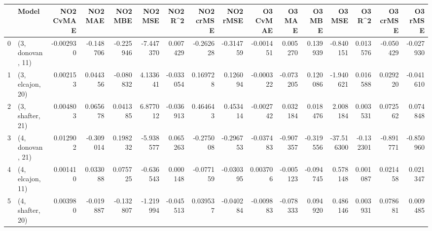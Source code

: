 \begin{tabular}{llrrrrrrrrrrrrrr}
\toprule
{} &             Model &  NO2 CvMAE &   NO2 MAE &   NO2 MBE &   NO2 MSE &   NO2 R\textasciicircum2 &  NO2 crMSE &  NO2 rMSE &  O3 CvMAE &    O3 MAE &    O3 MBE &     O3 MSE &    O3 R\textasciicircum2 &  O3 crMSE &   O3 rMSE \\
\midrule
0 &  (3, donovan, 11) &  -0.002930 & -0.148706 & -0.225946 & -7.447370 &  0.007429 &  -0.262628 & -0.314759 & -0.001451 &  0.005270 &  0.139939 &  -0.840151 &  0.013576 & -0.050429 & -0.027930 \\
1 &  (3, elcajon, 20) &   0.002153 &  0.044356 & -0.080832 &  4.133641 & -0.033054 &   0.169728 &  0.126094 & -0.000322 & -0.073205 &  0.120086 &  -1.940621 &  0.016588 &  0.029220 & -0.041610 \\
2 &  (3, shafter, 21) &   0.004803 &  0.065678 &  0.041385 &  6.877012 & -0.036913 &   0.464643 &  0.453414 & -0.002742 &  0.032184 &  0.018476 &   2.008184 &  0.003531 &  0.072562 &  0.074848 \\
3 &  (4, donovan, 21) &   0.012902 & -0.309014 &  0.198232 & -5.938577 &  0.065263 &  -0.275008 & -0.296753 & -0.037483 & -0.907357 & -0.319556 & -37.516300 & -0.132301 & -0.891771 & -0.850960 \\
4 &  (4, elcajon, 11) &   0.001410 &  0.033088 &  0.075725 & -0.636543 &  0.000148 &  -0.077159 & -0.030395 &  0.003706 & -0.005123 & -0.094745 &   0.578148 &  0.001087 &  0.021458 &  0.021347 \\
5 &  (4, shafter, 20) &   0.003980 & -0.019887 & -0.132807 & -1.219994 & -0.045513 &   0.039537 & -0.040284 & -0.009883 & -0.078333 &  0.094920 &   0.486146 &  0.003931 &  0.078681 &  0.009485 \\
\bottomrule
\end{tabular}
